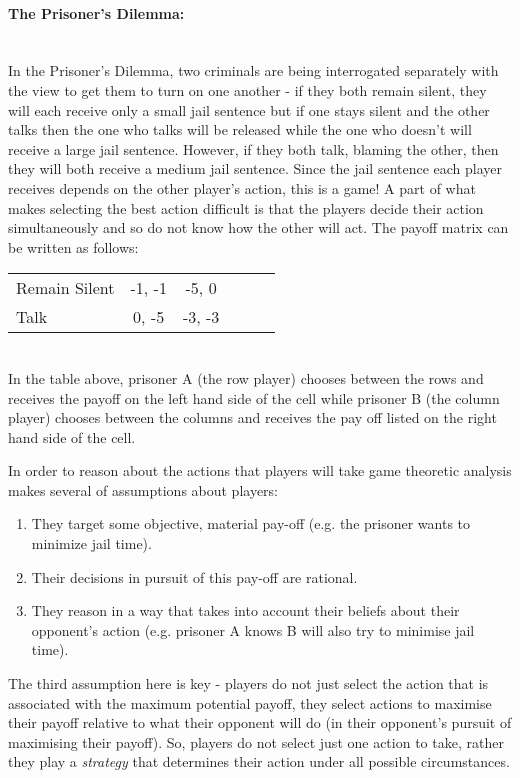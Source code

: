 \documentclass[11pt]{article}
\newcommand*{\np}{\par\noindent\newline}
\begin{document}
\paragraph{The Prisoner's Dilemma:}\mbox{}\\
In the Prisoner's Dilemma, two criminals are being interrogated
separately with the view to get them to turn on one another - if they both
remain silent, they will each receive only a small jail sentence but if one
stays silent and the other talks then the one who talks will be released while
the one who doesn't will receive a large jail sentence. However, if they both
talk, blaming the other, then they will both receive a medium jail sentence.
Since the jail sentence each player receives depends on the other player's
action, this is a game! A part of what makes selecting the best action
difficult is that the players decide their action simultaneously and so do not
know how the other will act. The payoff matrix can be written as follows:
\begin{center}
   \begin{tabular}{|l||*{5}{c|}}\hline
	\backslashbox{Prisoner A}{Prisoner B}
	&\makebox[7em]{Remain Silent}&\makebox[7em]{Talk}\\\hline\hline
	Remain Silent & -1, -1 & -5, 0\\\hline
	Talk & 0, -5 & -3, -3 \\\hline
	\end{tabular}
\end{center}\mbox{}\\
In the table above, prisoner A (the row player) chooses between the rows and
receives the payoff on the left hand side of the cell while prisoner B (the
column player) chooses between the columns and receives the pay off listed on
the right hand side of the cell.
\np In order to reason about the actions that players will take game theoretic
analysis makes several of assumptions about players:
\begin{enumerate}
    \item They target some objective, material pay-off (e.g. the prisoner wants
    to minimize jail time).
    \item Their decisions in pursuit of this pay-off are rational.
    \item They reason in a way that takes into account their beliefs about
    their opponent's action (e.g. prisoner A knows B will also try to minimise
    jail time). 
\end{enumerate}
\cite{osborne_course_1994}
\np The third assumption here is key - players do not just select the action
that is associated with the maximum potential payoff, they select actions to
maximise their payoff relative to what their opponent will do (in their
opponent's pursuit of maximising their payoff). So, players do not select just
one action to take, rather they play a \textit{strategy} that determines their
action under all possible circumstances.
\end{document}

